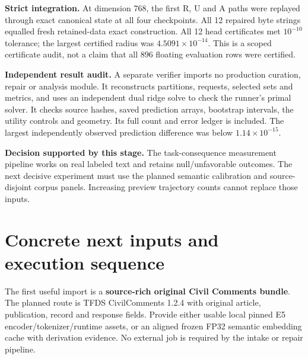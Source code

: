 \documentclass[11pt,a4paper]{article}
\begin{document}
\textbf{Strict integration.} At dimension 768, the first R, U and A paths
were replayed through exact canonical state at all four checkpoints. All
12 repaired byte strings equalled fresh retained-data exact construction.
All 12 head certificates met $10^{-10}$ tolerance; the largest certified
radius was $4.5091\times10^{-14}$. This is a scoped certificate audit,
not a claim that all 896 floating evaluation rows were certified.

\textbf{Independent result audit.} A separate verifier imports no production
curation, repair or analysis module. It reconstructs partitions, requests,
selected sets and metrics, and uses an independent dual ridge solve to check
the runner's primal solver. It checks source hashes, saved prediction arrays,
bootstrap intervals, the utility controls and geometry. Its full count and
error ledger is included. The largest independently observed prediction
difference was below $1.14\times10^{-15}$.

\textbf{Decision supported by this stage.} The task-consequence measurement
pipeline works on real labeled text and retains null/unfavorable outcomes.
The next decisive experiment must use the planned semantic calibration and
source-disjoint corpus panels. Increasing preview trajectory counts cannot
replace those inputs.
\newpage

\section*{Concrete next inputs and execution sequence}
The first useful import is a \textbf{source-rich original Civil Comments
bundle}. The planned route is TFDS CivilComments 1.2.4 with original article,
publication, record and response fields. Provide either usable local pinned
E5 encoder/tokenizer/runtime assets, or an aligned frozen FP32 semantic
embedding cache with derivation evidence. No external job is required by the
intake or repair pipeline.
\end{document}
